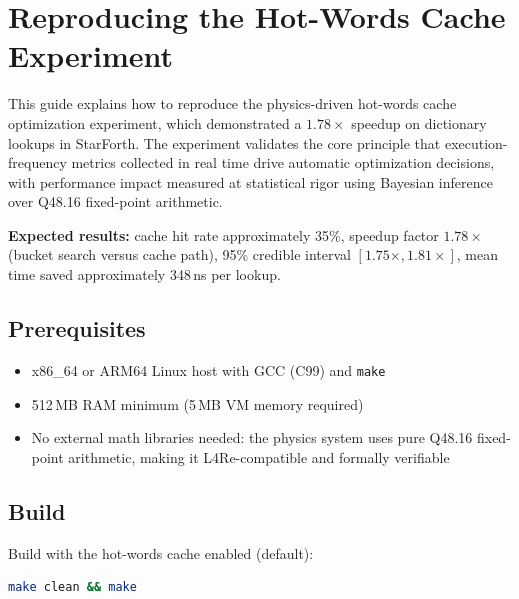 
\section{Reproducing the Hot-Words Cache Experiment}

This guide explains how to reproduce the physics-driven hot-words cache
optimization experiment, which demonstrated a $1.78\times$ speedup on
dictionary lookups in StarForth. The experiment validates the core
principle that execution-frequency metrics collected in real time
drive automatic optimization decisions, with performance impact measured
at statistical rigor using Bayesian inference over Q48.16 fixed-point
arithmetic.

\textbf{Expected results:} cache hit rate approximately 35\%, speedup
factor $1.78\times$ (bucket search versus cache path), 95\% credible
interval $[1.75\times, 1.81\times]$, mean time saved approximately
348\,ns per lookup.

\subsection{Prerequisites}

\begin{itemize}
  \item x86\_64 or ARM64 Linux host with GCC (C99) and \texttt{make}
  \item 512\,MB RAM minimum (5\,MB VM memory required)
  \item No external math libraries needed: the physics system uses pure
        Q48.16 fixed-point arithmetic, making it L4Re-compatible and
        formally verifiable
\end{itemize}

\subsection{Build}

Build with the hot-words cache enabled (default):

\begin{lstlisting}[language=bash]
make clean && make
\end{lstlisting}

